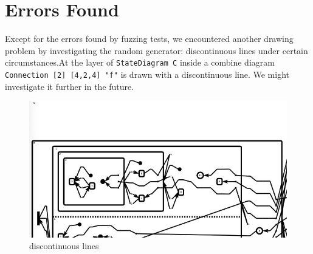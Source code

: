 \section{Errors Found}
Except for the errors found by fuzzing tests, we encountered another drawing problem by investigating the random generator: discontinuous lines under certain circumstances.At the layer of \verb|StateDiagram C| inside a combine diagram \verb|Connection [2] [4,2,4] "f"| is drawn with a discontinuous line. We might investigate it further in the future.
\begin{figure}[ht]
    \centering
    \includegraphics[scale=0.5]{Bilder/error.jpg}
    \caption{discontinuous lines}
    \label{fig:error}
\end{figure}


